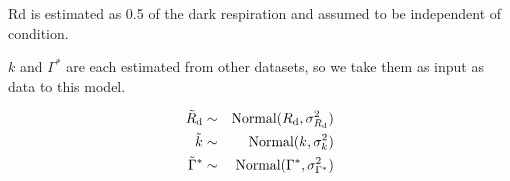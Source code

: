 Rd is estimated as 0.5 of the dark respiration and assumed to be independent of condition.

$k$ and $\Gamma^{\ast}$ are each estimated from other datasets,
  so we take them as input as data to this model.

\begin{eqnarray}
  \sdataRd
    & \sim &
  \Normal(\sRd,\ssigRd)
\nonumber\\ %
  \sdatak
    & \sim &
  \Normal(\ssk,\ssigk)
\nonumber\\ %
  \sdataGammastar
    & \sim &
  \Normal(\sGammastar,\ssigGammastar)
\nonumber
\end{eqnarray}




